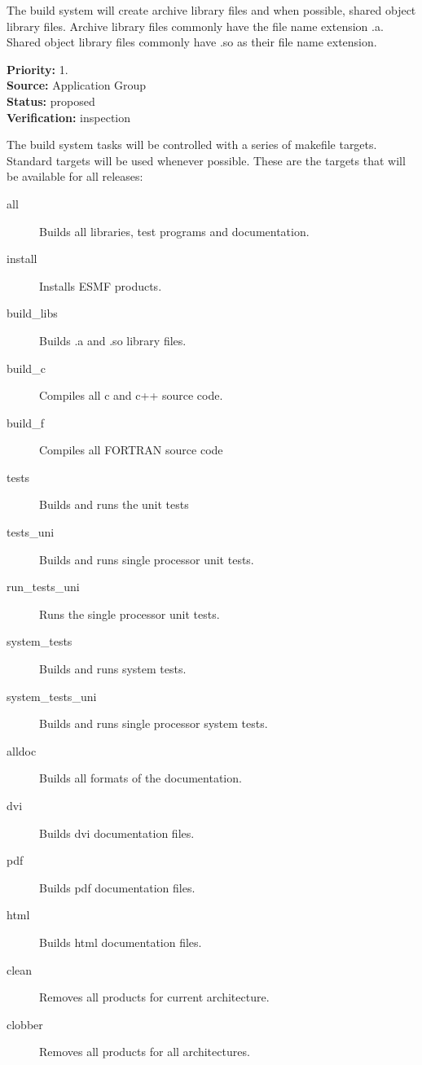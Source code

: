 

The build system will create  archive library files and when
possible, shared object library files. Archive library files commonly
have the file name extension .a.  Shared object library files commonly
have .so as their file name extension.
\begin{reqlist}
{\bf Priority:} 1. \\
{\bf Source:} Application Group \\
{\bf Status:}  proposed \\
{\bf Verification:} inspection
\end{reqlist}

The build system tasks will be controlled with a series of
makefile targets. Standard targets will be used whenever 
possible. These are the targets that will be available
for all releases:

\begin{description}
\item[all] Builds all libraries, test programs and documentation.
\item[install] Installs ESMF products.

\item[build\_libs] Builds .a and .so library files.
\item[build\_c] Compiles all c and c++ source code.  
\item[build\_f] Compiles all FORTRAN source code 

\item[tests] Builds and runs the unit tests
\item[tests\_uni] Builds and runs single processor unit tests.

\item[run\_tests\_uni] Runs the single processor unit tests.
\item[system\_tests] Builds and runs system tests.
\item[system\_tests\_uni] Builds and runs single processor system tests.

\item[alldoc] Builds all formats of the documentation.
\item[dvi] Builds dvi documentation files.
\item[pdf] Builds pdf documentation files.
\item[html] Builds html documentation files.
\item[clean] Removes all products for current architecture.
\item[clobber] Removes all products for all architectures.

\end{description}

